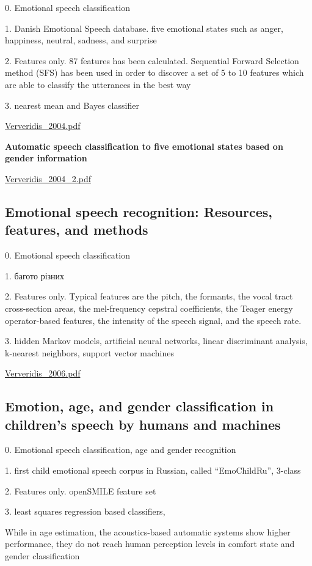 0. Emotional speech classification

1. Danish Emotional Speech database. five emotional states such as anger, happiness, neutral, sadness, and surprise

2.  Features only. 87 features has been calculated. Sequential Forward Selection
method (SFS) has been used in order to discover a set of 5
to 10 features which are able to classify the utterances in the best
way

3. nearest mean
and Bayes classifier

\url{Ververidis_2004.pdf}\cite{Ververidis_2004}

\textbf{Automatic speech classification to five emotional states based on gender information}

\url{Ververidis_2004_2.pdf}\cite{Ververidis_2004_2}

\subsection{Emotional speech recognition: Resources, features, and methods}

0. Emotional speech classification

1. багото різних

2. Features only.  Typical features are the pitch, the
formants, the vocal tract cross-section areas, the mel-frequency cepstral coefficients, the Teager energy operator-based features,
the intensity of the speech signal, and the speech rate. 

3.  hidden Markov models, artificial neural networks, linear discriminant
analysis, k-nearest neighbors, support vector machines

\url{Ververidis_2006.pdf}\cite{Ververidis_2006}

\subsection{Emotion, age, and gender classification in children’s speech by humans and machines}

0. Emotional speech classification, age and gender recognition

1. first child emotional speech corpus in Russian, called “EmoChildRu”, 3-class

2. Features only. openSMILE feature set

3. least squares regression based classifiers, 

While in age estimation, the acoustics-based automatic systems show higher performance, they do not reach human perception levels in comfort state and gender classification


